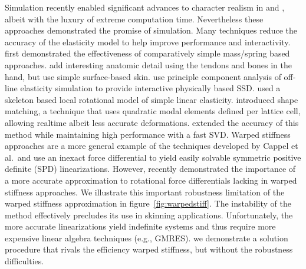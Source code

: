 Simulation recently enabled significant advances to character realism in \cite{Irving:2008:SDF} and \cite{clutterbuck:2010:avatar}, albeit with the luxury of extreme computation
time. Nevertheless these approaches demonstrated the promise of simulation. Many techniques reduce the accuracy of the elasticity model to help improve performance and
interactivity. \cite{Waters90,Chadwick89} first demonstrated the effectiveness of comparatively simple mass/spring based approaches. \cite{Sueda:2008} add interesting anatomic detail using the
tendons and bones in the hand, but use simple surface-based skin. {\cite{Shi:2008:exampledynskin}} \cite{Kry02} use principle component analysis of off-line elasticity simulation to provide interactive physically based SSD. \cite{capell:2005:pb,Capell:2002:ISD:566570.566622,Galopo07} used a skeleton based local rotational model of simple linear elasticity. \cite{Muller:2005:MDB} introduced shape matching, a technique that uses quadratic modal elements defined per lattice cell, allowing realtime albeit less accurate deformations. \cite{Rivers:2007:FFL} extended the accuracy of this
method while maintaining high performance with a fast SVD. Warped stiffness approaches \cite{Muller:2002:SRD,Muller:2004:IVM,muller:2004:surfacemeshes} are a more general example of the techniques developed by Cappel et al.\ and use an inexact force differential to yield easily solvable symmetric positive definite (SPD) linearizations. However, \cite{Chao:2010:SGM} recently demonstrated the importance of a more accurate approximation to rotational force differentials lacking in warped stiffness approaches. We  illustrate this important robustness limitation of the warped stiffness approximation in figure~\ref{fig:warpedstiff}. The instability of the method effectively precludes its use in skinning applications. Unfortunately, the more accurate linearizations  yield indefinite systems and thus require more expensive linear algebra techniques (e.g., GMRES).  we demonstrate a solution procedure  that rivals the efficiency  warped stiffness, but without the robustness difficulties.


